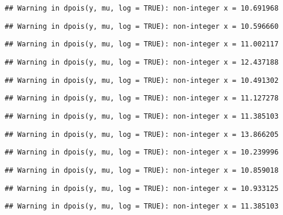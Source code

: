 \documentclass[
]{article}
\begin{document}
\begin{verbatim}
## Warning in dpois(y, mu, log = TRUE): non-integer x = 10.691968
\end{verbatim}

\begin{verbatim}
## Warning in dpois(y, mu, log = TRUE): non-integer x = 10.596660
\end{verbatim}

\begin{verbatim}
## Warning in dpois(y, mu, log = TRUE): non-integer x = 11.002117
\end{verbatim}

\begin{verbatim}
## Warning in dpois(y, mu, log = TRUE): non-integer x = 12.437188
\end{verbatim}

\begin{verbatim}
## Warning in dpois(y, mu, log = TRUE): non-integer x = 10.491302
\end{verbatim}

\begin{verbatim}
## Warning in dpois(y, mu, log = TRUE): non-integer x = 11.127278
\end{verbatim}

\begin{verbatim}
## Warning in dpois(y, mu, log = TRUE): non-integer x = 11.385103
\end{verbatim}

\begin{verbatim}
## Warning in dpois(y, mu, log = TRUE): non-integer x = 13.866205
\end{verbatim}

\begin{verbatim}
## Warning in dpois(y, mu, log = TRUE): non-integer x = 10.239996
\end{verbatim}

\begin{verbatim}
## Warning in dpois(y, mu, log = TRUE): non-integer x = 10.859018
\end{verbatim}

\begin{verbatim}
## Warning in dpois(y, mu, log = TRUE): non-integer x = 10.933125
\end{verbatim}

\begin{verbatim}
## Warning in dpois(y, mu, log = TRUE): non-integer x = 11.385103
\end{verbatim}
\end{document}

